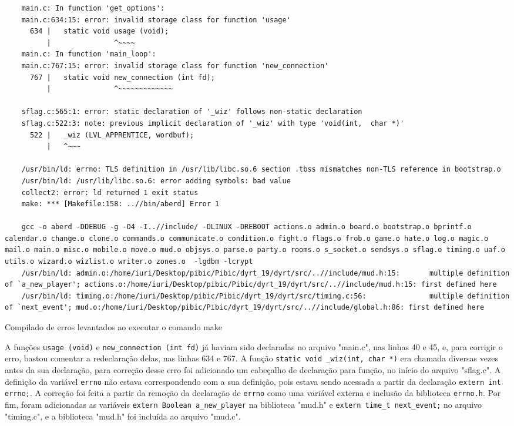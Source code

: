 \begin{listing}[!ht]
    \begin{verbatim}
    main.c: In function 'get_options':
    main.c:634:15: error: invalid storage class for function 'usage'
      634 |   static void usage (void);
          |               ^~~~~
    main.c: In function 'main_loop':
    main.c:767:15: error: invalid storage class for function 'new_connection'
      767 |   static void new_connection (int fd);
          |               ^~~~~~~~~~~~~~

    sflag.c:565:1: error: static declaration of '_wiz' follows non-static declaration
    sflag.c:522:3: note: previous implicit declaration of '_wiz' with type 'void(int,  char *)'
      522 |   _wiz (LVL_APPRENTICE, wordbuf);
          |   ^~~~

    /usr/bin/ld: errno: TLS definition in /usr/lib/libc.so.6 section .tbss mismatches non-TLS reference in bootstrap.o
    /usr/bin/ld: /usr/lib/libc.so.6: error adding symbols: bad value
    collect2: error: ld returned 1 exit status
    make: *** [Makefile:158: ..//bin/aberd] Error 1

    gcc -o aberd -DDEBUG -g -O4 -I..//include/ -DLINUX -DREBOOT actions.o admin.o board.o bootstrap.o bprintf.o calendar.o change.o clone.o commands.o communicate.o condition.o fight.o flags.o frob.o game.o hate.o log.o magic.o mail.o main.o misc.o mobile.o move.o mud.o objsys.o parse.o party.o rooms.o s_socket.o sendsys.o sflag.o timing.o uaf.o utils.o wizard.o wizlist.o writer.o zones.o  -lgdbm -lcrypt
    /usr/bin/ld: admin.o:/home/iuri/Desktop/pibic/Pibic/dyrt_19/dyrt/src/..//include/mud.h:15: 		 multiple definition of `a_new_player'; actions.o:/home/iuri/Desktop/pibic/Pibic/dyrt_19/dyrt/src/..//include/mud.h:15: first defined here
    /usr/bin/ld: timing.o:/home/iuri/Desktop/pibic/Pibic/dyrt_19/dyrt/src/timing.c:56:		 		 multiple definition of `next_event'; mud.o:/home/iuri/Desktop/pibic/Pibic/dyrt_19/dyrt/src/..//include/global.h:86: first defined here
    \end{verbatim}
\caption{Compilado de erros levantados ao executar o comando make}
\label{lst:errorsCompilation}
\end{listing}

A funções \verb|usage (void)| e \verb|new_connection (int fd)| já haviam sido declaradas no arquivo "main.c", 
nas linhas 40 e 45, e, para corrigir o erro, bastou comentar a redeclaração delas, nas linhas 634 e 767. 
A função \verb|static void _wiz(int, char *)| era chamada diversas vezes antes da sua declaração, para correção 
desse erro foi adicionado um cabeçalho de declaração para função, no início do arquivo "sflag.c". A definição 
da variável \verb|errno| não estava correspondendo com a sua definição, pois estava sendo acessada a partir 
da declaração \verb|extern int errno;|. A correção foi feita a partir da remoção da declaração de \verb|errno| 
como uma variável externa e inclusão da biblioteca \verb|errno.h|. Por fim, foram adicionadas as variáveis 
\verb|extern Boolean a_new_player| na biblioteca "mud.h" e \verb|extern time_t next_event;| no arquivo 
"timing.c", e a biblioteca "mud.h" foi incluída ao arquivo "mud.c".

